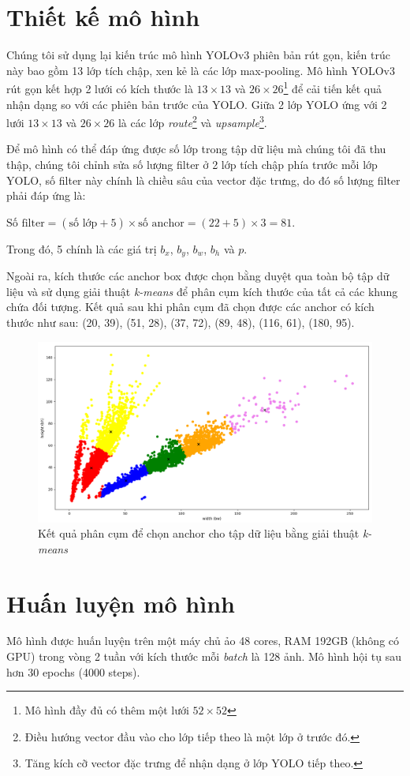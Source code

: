 \documentclass[../thesis.tex]{subfiles}
\begin{document}
\section{Thiết kế mô hình}

Chúng tôi sử dụng lại kiến trúc mô hình YOLOv3 phiên bản rút gọn, kiến trúc này bao gồm 13 lớp tích chập, xen kẻ là các lớp max-pooling. Mô hình YOLOv3 rút gọn kết hợp 2 lưới có kích thước là $13 \times 13$ và $26 \times 26$\footnote{Mô hình đầy đủ có thêm một lưới $52 \times 52$} để cải tiến kết quả nhận dạng so với các phiên bản trước của YOLO. Giữa 2 lớp YOLO ứng với 2 lưới $13 \times 13$ và $26 \times 26$ là các lớp \textit{route}\footnote{Điều hướng vector đầu vào cho lớp tiếp theo là một lớp ở trước đó.} và \textit{upsample}\footnote{Tăng kích cỡ vector đặc trưng để nhận dạng ở lớp YOLO tiếp theo.}.

Để mô hình có thể đáp ứng được số lớp trong tập dữ liệu mà chúng tôi đã thu thập, chúng tôi chỉnh sửa số lượng filter ở 2 lớp tích chập phía trước mỗi lớp YOLO, số filter này chính là chiều sâu của vector đặc trưng, do đó số lượng filter phải đáp ứng là:

$\text{Số filter} = \left(\text{số lớp} + 5\right) \times \text{số anchor} = \left(\text{22} + 5\right) \times \text{3} = 81$.

Trong đó, 5 chính là các giá trị $b_x$, $b_y$, $b_w$, $b_h$ và $p$.

Ngoài ra, kích thước các anchor box được chọn bằng duyệt qua toàn bộ tập dữ liệu và sử dụng giải thuật \textit{k-means} để phân cụm kích thước của tất cả các khung chứa đối tượng. Kết quả sau khi phân cụm đã chọn được các anchor có kích thước như sau: (20, 39), (51, 28), (37, 72), (89, 48), (116, 61), (180, 95).

\begin{figure}[H]
    \centering
    \includegraphics[width=\linewidth]{images/6_anchors.png}
    \caption{Kết quả phân cụm để chọn anchor cho tập dữ liệu bằng giải thuật \textit{k-means}}
    \label{6_anchors}
\end{figure}

\section{Huấn luyện mô hình}

Mô hình được huấn luyện trên một máy chủ ảo 48 cores, RAM 192GB (không có GPU) trong vòng 2 tuần với kích thước mỗi \textit{batch} là 128 ảnh. Mô hình hội tụ sau hơn 30 epochs (4000 steps).
\end{document}
